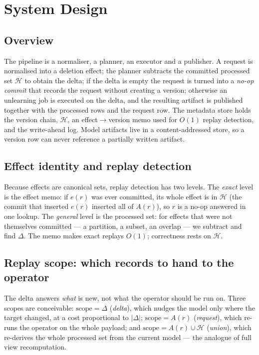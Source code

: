 \documentclass[conference]{IEEEtran}
\newcommand{\Hset}{\mathcal{H}}
\begin{document}
\section{System Design}
\label{sec:design}



\subsection{Overview}

The pipeline is a normaliser, a planner, an executor and a publisher.  A request is normalised into a deletion effect;
the planner subtracts the committed processed set $\Hset$ to obtain the delta; if the
delta is empty the request is turned into a \emph{no-op commit} that records the
request without creating a version; otherwise an unlearning job is executed on the
delta, and the resulting artifact is published together with the processed rows and
the request row.  The metadata store holds the version chain, $\Hset$, an
effect$\to$version memo used for $O(1)$ replay detection, and the write-ahead log.
Model artifacts live in a content-addressed store, so a version row can never
reference a partially written artifact.

\subsection{Effect identity and replay detection}

Because effects are canonical sets, replay detection has two levels.  The \emph{exact} level
is the effect memo: if $e(r)$ was ever committed, its whole effect is in $\Hset$ (the commit
that inserted $e(r)$ inserted all of $A(r)$), so $r$ is a no-op answered in one lookup.  The
\emph{general} level is the processed set: for effects that were not themselves committed
--- a partition, a subset, an overlap --- we subtract and find $\Delta$.  The memo makes
exact replays $O(1)$; correctness rests on $\Hset$.

\subsection{Replay scope: which records to hand to the operator}
\label{sec:scope}

The delta answers \emph{what} is new, not what the operator should be run on.  Three scopes are
conceivable: $\mathrm{scope}=\Delta$ (\emph{delta}), which nudges the model only where the
target changed, at a cost proportional to $|\Delta|$; $\mathrm{scope}=A(r)$ (\emph{request}),
which re-runs the operator on the whole payload; and $\mathrm{scope}=A(r)\cup\Hset$
(\emph{union}), which re-derives the whole processed set from the current model --- the analogue
of full view recomputation.
\end{document}
